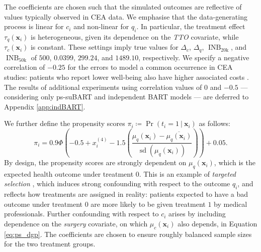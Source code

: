 \documentclass[aoas,preprint]{imsart}
\newcommand\given[1][]{\:#1\vert\:}
\theoremstyle{plain}
\theoremstyle{definition}
\theoremstyle{remark}
\begin{document}
The coefficients are chosen such that the simulated outcomes are reflective of values typically observed in CEA data. We emphasise that the data-generating process is linear for $c_i$ and non-linear for $q_i$. In particular, the treatment effect $\tau_q(\mathbf{x}_i)$ is heterogeneous, given its dependence on the \textit{TTO} covariate, while $\tau_c(\mathbf{x}_i)$ is constant. 
These settings imply true values for $\Delta_c$, $\Delta_q$, $\operatorname{INB}_{20\mathrm{k}}$, and $\operatorname{INB}_{50\mathrm{k}}$ of $500$, $0.0399$, $299.24$, and $1489.10$, respectively. We specify a negative correlation of $-0.25$ for the errors to model a common occurrence in CEA studies: patients who report lower well-being also have higher associated costs \citep{glick2014economic}.
The results of additional experiments using correlation values of $0$ and $-0.5$ --- considering only ps-suBART and independent BART models --- are deferred to Appendix \ref{app:indBART}.

We further define the propensity scores $\pi_i \coloneqq \Pr(t_i = 1 \given \mathbf{x}_i)$ as follows:
\begin{equation}
\pi_i = 0.9 \Phi\left(-0.5 + x^{(4)}_i -1.5\left(\frac{\mu_q(\mathbf{x}_i) - \overline{\mu_q(\mathbf{x}_i)}}{\operatorname{sd}(\mu_q(\mathbf{x}_i))}\right)\right) + 0.05.\label{eq:ps_dgp}
\end{equation}
By design, the propensity scores are strongly dependent on $\mu_q(\mathbf{x}_i)$, which is the expected health outcome under treatment $0$. This is an example of \textit{targeted selection} \citep{hahn2020bayesian}, which induces strong confounding with respect to the outcome $q_i$, and reflects how treatments are assigned in reality: patients expected to have a bad outcome under treatment $0$ are more likely to be given treatment $1$ by medical professionals. Further confounding with respect to $c_i$ arises by including dependence on the \textit{surgery} covariate, on which $\mu_c(\mathbf{x}_i)$ also depends, in Equation \eqref{eq:ps_dgp}. The coefficients are chosen to ensure roughly balanced sample sizes for the two treatment groups.
\end{document}
